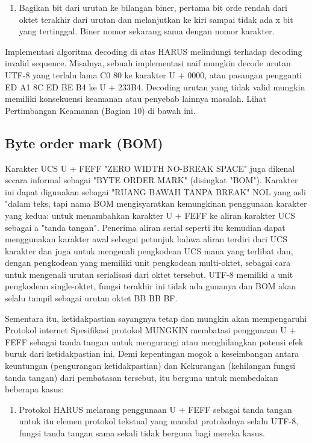 \begin{enumerate}
\begin{enumerate}
   \item Bagikan bit dari urutan ke bilangan biner, pertama
       bit orde rendah dari oktet terakhir dari urutan dan
       melanjutkan ke kiri sampai tidak ada x bit yang tertinggal. Biner
       nomor sekarang sama dengan nomor karakter.
    \end{enumerate}
   Implementasi algoritma decoding di atas HARUS melindungi terhadap
   decoding invalid sequence. Misalnya, sebuah implementasi naif mungkin
   decode urutan UTF-8 yang terlalu lama C0 80 ke karakter U + 0000,
   atau pasangan pengganti ED A1 8C ED BE B4 ke U + 233B4. Decoding
   urutan yang tidak valid mungkin memiliki konsekuensi keamanan atau penyebab lainnya
   masalah. Lihat Pertimbangan Keamanan (Bagian 10) di bawah ini.

	\subsection{Byte order mark (BOM)}
   Karakter UCS U + FEFF "ZERO WIDTH NO-BREAK SPACE" juga dikenal
   secara informal sebagai "BYTE ORDER MARK" (disingkat "BOM"). Karakter ini
   dapat digunakan sebagai "RUANG BAWAH TANPA BREAK" NOL yang asli "dalam teks, tapi
   nama BOM mengisyaratkan kemungkinan penggunaan karakter yang kedua: untuk
   menambahkan karakter U + FEFF ke aliran karakter UCS sebagai a
   "tanda tangan". Penerima aliran serial seperti itu kemudian dapat menggunakan
   karakter awal sebagai petunjuk bahwa aliran terdiri dari UCS
   karakter dan juga untuk mengenali pengkodean UCS mana yang terlibat dan,
   dengan pengkodean yang memiliki unit pengkodean multi-oktet, sebagai cara untuk mengenali urutan serialisasi dari oktet tersebut. UTF-8 memiliki a
   unit pengkodean single-oktet, fungsi terakhir ini tidak ada gunanya dan BOM
   akan selalu tampil sebagai urutan oktet BB BB BF.

Sementara itu, ketidakpastian sayangnya tetap dan mungkin akan mempengaruhi
   Protokol internet Spesifikasi protokol MUNGKIN membatasi penggunaan
   U + FEFF sebagai tanda tangan untuk mengurangi atau menghilangkan potensi
   efek buruk dari ketidakpastian ini. Demi kepentingan mogok a
   keseimbangan antara keuntungan (pengurangan ketidakpastian) dan
   Kekurangan (kehilangan fungsi tanda tangan) dari pembatasan tersebut, itu
   berguna untuk membedakan beberapa kasus:
\begin{enumerate}

    \item Protokol HARUS melarang penggunaan U + FEFF sebagai tanda tangan untuk itu
      elemen protokol tekstual yang mandat protokolnya selalu
      UTF-8, fungsi tanda tangan sama sekali tidak berguna bagi mereka
      kasus.


\end{enumerate}
\end{enumerate}
